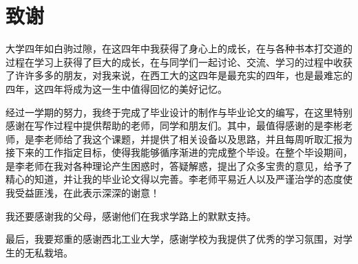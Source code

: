 \chapter{致谢}
	\par 大学四年如白驹过隙，在这四年中我获得了身心上的成长，在与各种书本打交道的过程在学习上获得了巨大的成长，在与同学们一起讨论、交流、学习的过程中收获了许许多多的朋友，对我来说，在西工大的这四年是最充实的四年，也是最难忘的四年，这四年将成为这一生中值得回忆的美好记忆。
	\par 经过一学期的努力，我终于完成了毕业设计的制作与毕业论文的编写，在这里特别感谢在写作过程中提供帮助的老师，同学和朋友们。其中，最值得感谢的是李彬老师，是李老师给了我这个课题，并提供了相关设备以及思路，并且每周听取汇报为接下来的工作指定目标，使得我能够循序渐进的完成整个毕设。在整个毕设期间，是李老师在我对各种理论产生困惑时，答疑解惑，提出了众多宝贵的意见，给予了精心的知道，并让我的毕业论文得以完善。李老师平易近人以及严谨治学的态度使我受益匪浅，在此表示深深的谢意！
	\par 我还要感谢我的父母，感谢他们在我求学路上的默默支持。
	\par 最后，我要郑重的感谢西北工业大学，感谢学校为我提供了优秀的学习氛围，对学生的无私栽培。